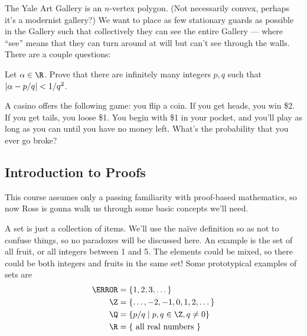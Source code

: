 \begin{problem}
The Yale Art Gallery is an $n$-vertex polygon. (Not necessarily convex, perhaps it's a modernist gallery?) We want to place as few stationary guards as possible in the Gallery such that collectively they can see the entire Gallery --- where ``see'' means that they can turn around at will but can't see through the walls. There are a couple questions:
\end{problem}

\begin{problem}
Let $\alpha \in \R$. Prove that there are infinitely many integers $p,q$ such that $\abs{\alpha - p/q} < 1/q^2$.
\end{problem}

\begin{problem}
A casino offers the following game: you flip a coin. If you get heads, you win \$2. If you get tails, you loose \$1. You begin with \$1 in your pocket, and you'll play as long as you can until you have no money left. What's the probability that you ever go broke?
\end{problem}

\subsection*{Introduction to Proofs}
This course assumes only a passing familiarity with proof-based mathematics, so now Ross is gonna walk us through some basic concepts we'll need.

\begin{definition}[Set]
A set is just a collection of items. We'll use the naïve definition so as not to confuse things, so no paradoxes will be discussed here. An example is the set of all fruit, or all integers between 1 and 5. The elements could be mixed, so there could be both integers and fruits in the same set! Some prototypical examples of sets are 
\begin{align*}
\N &= \{1, 2,3, \dotsc\} \\
\Z &= \{\dotsc, -2, -1, 0, 1, 2, \dotsc\}  \\
\Q &= \{p/q \mid p,q \in \Z, q \not= 0 \} \\
\R &= \{\text{~all real numbers~}\}
\end{align*}
\end{definition}

